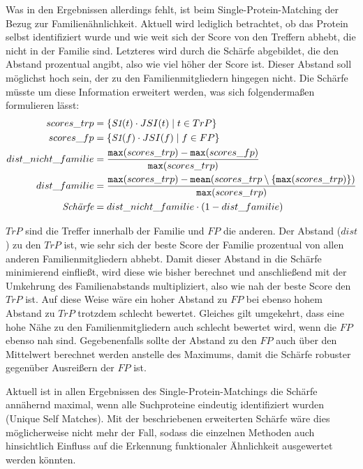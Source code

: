     Was in den Ergebnissen allerdings fehlt, ist beim Single-Protein-Matching der Bezug zur Familienähnlichkeit. Aktuell wird lediglich betrachtet, ob das Protein selbst identifiziert wurde und wie weit sich der Score von den Treffern abhebt, die nicht in der Familie sind. Letzteres wird durch die Schärfe abgebildet, die den Abstand prozentual angibt, also wie viel höher der Score ist. Dieser Abstand soll möglichst hoch sein, der zu den Familienmitgliedern hingegen nicht. Die Schärfe müsste um diese Information erweitert werden, was sich folgendermaßen formulieren lässt:
    \begin{equation}
        \label{equ:}
        \begin{split}
            scores\_trp &= \{\emph{S1}(t) \cdot JSI(t) \mid t \in TrP\}\\
            scores\_fp &= \{\emph{S1}(f) \cdot JSI(f) \mid f \in FP\}\\
            dist\_nicht\_familie &= \frac{\texttt{max}(scores\_trp) - \texttt{max}(scores\_fp)}{\texttt{max}(scores\_trp)}\\
            dist\_familie &= \frac{\texttt{max}(scores\_trp) - \texttt{mean}(scores\_trp \setminus \{\texttt{max}(scores\_trp)\})}{\texttt{max}(scores\_trp)}\\
            \emph{Schärfe} &= dist\_nicht\_familie \cdot (1 - dist\_familie)
        \end{split}
    \end{equation}

    $TrP$ sind die Treffer innerhalb der Familie und $FP$ die anderen. Der Abstand ($dist$) zu den $TrP$ ist, wie sehr sich der beste Score der Familie prozentual von allen anderen Familienmitgliedern abhebt. Damit dieser Abstand in die Schärfe minimierend einfließt, wird diese wie bisher berechnet und anschließend mit der Umkehrung des Familienabstands multipliziert, also wie nah der beste Score den $TrP$ ist. Auf diese Weise wäre ein hoher Abstand zu $FP$ bei ebenso hohem Abstand zu $TrP$ trotzdem schlecht bewertet. Gleiches gilt umgekehrt, dass eine hohe Nähe zu den Familienmitgliedern auch schlecht bewertet wird, wenn die $FP$ ebenso nah sind. Gegebenenfalls sollte der Abstand zu den $FP$ auch über den Mittelwert berechnet werden anstelle des Maximums, damit die Schärfe robuster gegenüber Ausreißern der $FP$ ist.

    Aktuell ist in allen Ergebnissen des Single-Protein-Matchings die Schärfe annähernd maximal, wenn alle Suchproteine eindeutig identifiziert wurden  (Unique Self Matches). Mit der beschriebenen erweiterten Schärfe wäre dies möglicherweise nicht mehr der Fall, sodass die einzelnen Methoden auch hinsichtlich Einfluss auf die Erkennung funktionaler Ähnlichkeit ausgewertet werden könnten.

